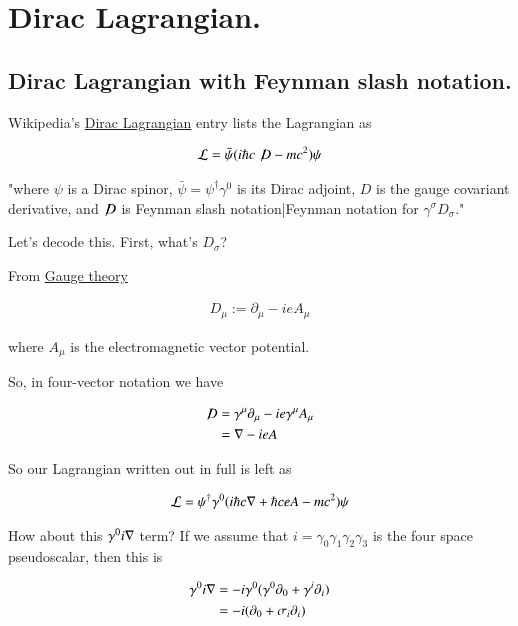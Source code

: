 \chapter{Dirac Lagrangian.}
\label{chap:diracLagrangian}
\date{Dec 21, 2008.  diracLagrangian.tex}

\section{Dirac Lagrangian with Feynman slash notation. }

Wikipedia's \href{http://en.wikipedia.org/wiki/Lagrangian#Dirac_Lagrangian}{Dirac Lagrangian} entry lists the Lagrangian as

\begin{align*}
\mathcal{L} = \bar \psi (i \hbar c \not\!D - mc^2) \psi
\end{align*}

"where $\psi\!$ is a Dirac spinor, $\bar \psi = \psi^\dagger \gamma^0$ is its Dirac adjoint, $D\!$ is the gauge covariant derivative, and $\not\!D$ is Feynman slash notation|Feynman notation for $\gamma^\sigma D_\sigma\!$."

Let's decode this.  First, what's $D_\sigma$?

From \href{http://en.wikipedia.org/wiki/Gauge_covariant_derivative}{Gauge theory}

\begin{align*}
D_\mu := \partial_\mu - i e A_\mu
\end{align*}

where $A_\mu$ is the electromagnetic vector potential.

So, in four-vector notation we have

\begin{align*}
\not\!D 
&= \gamma^\mu \partial_\mu - i e \gamma^\mu A_\mu \\
&= \nabla - i e A \\
\end{align*}

So our Lagrangian written out in full is left as

\begin{align}\label{eqn:diracLag:lag1}
\mathcal{L} = \psi^\dagger \gamma^0 ( i \hbar c \nabla + \hbar c e A - mc^2) \psi
\end{align}

How about this $\gamma^0 i \nabla$ term?  If we assume that $i = \gamma_0 \gamma_1 \gamma_2 \gamma_3$ is the four space pseudoscalar, then this is

\begin{align*}
\gamma^0 i \nabla
&= - i \gamma^0 (\gamma^0 \partial_0 + \gamma^i \partial_i) \\
&= - i (\partial_0 + \sigma_i \partial_i) \\
\end{align*}

